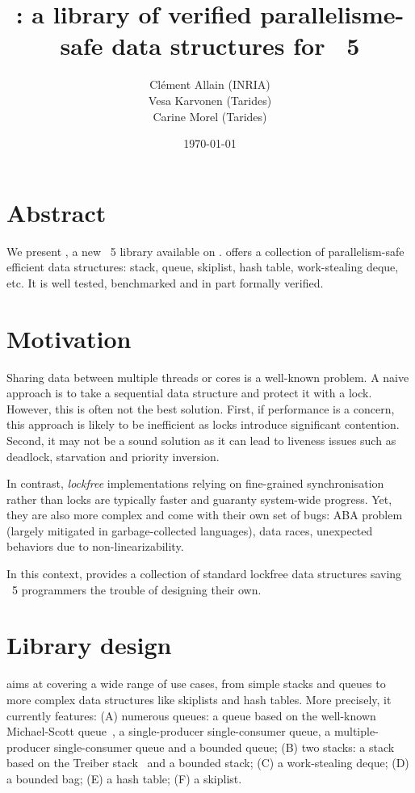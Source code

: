 \documentclass[a4paper, 11pt]{article}
\title{\Saturn: a library of verified parallelisme-safe data structures for \OCaml~5}
\date{\today}
\author{
  Clément Allain (INRIA) \\
  Vesa Karvonen (Tarides) \\
  Carine Morel (Tarides)
}
\begin{document}
\maketitle

\section{Abstract}

We present \Saturn, a new \OCaml~5 library available on \opam.
\Saturn offers a collection of parallelism-safe efficient data structures: stack, queue, skiplist, hash table, work-stealing deque, etc.
It is well tested, benchmarked and in part formally verified.

\section{Motivation}

Sharing data between multiple threads or cores is a well-known problem.
A naive approach is to take a sequential data structure and protect it with a lock.
However, this is often not the best solution.
First, if performance is a concern, this approach is likely to be inefficient as locks introduce significant contention.
Second, it may not be a sound solution as it can lead to liveness issues such as deadlock, starvation and priority inversion.

In contrast, \emph{lockfree} implementations relying on fine-grained synchronisation rather than locks are typically faster and guaranty system-wide progress.
Yet, they are also more complex and come with their own set of bugs: ABA problem (largely mitigated in garbage-collected languages), data races, unexpected behaviors due to non-linearizability.

In this context, \Saturn provides a collection of standard lockfree data structures saving \OCaml~5 programmers the trouble of designing their own.

\section{Library design}

\Saturn aims at covering a wide range of use cases, from simple stacks and queues to more complex data structures like skiplists and hash tables.
More precisely, it currently features:
(A) numerous queues: a queue based on the well-known Michael-Scott queue~\cite{michael1996simple}, a single-producer single-consumer queue, a multiple-producer single-consumer queue and a bounded queue; 
(B) two stacks: a stack based on the Treiber stack~\cite{treiber1986systems} and a bounded stack; %
(C) a work-stealing deque;
(D) a bounded bag;
(E) a hash table;
(F) a skiplist.
\end{document}
